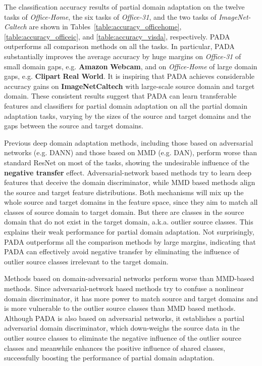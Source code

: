 \documentclass[runningheads]{llncs}
\begin{document}
The classification accuracy results of partial domain adaptation on the twelve tasks of \textit{Office-Home}, the six tasks of \textit{Office-31}, and the two tasks of \textit{ImageNet-Caltech} are shown in Tables~\ref{table:accuracy_officehome}, \ref{table:accuracy_officeic}, and \ref{table:accuracy_visda}, respectively. PADA outperforms all comparison methods on all the tasks. In particular, PADA substantially improves the average accuracy by huge margins on \textit{Office-31} of small domain gaps, e.g. \textbf{Amazon}  \textbf{Webcam}, and on \textit{Office-Home} of large domain gaps, e.g. \textbf{Clipart}  \textbf{Real World}. It is inspiring that PADA achieves considerable accuracy gains on \textbf{ImageNet}\textbf{Caltech} with large-scale source domain and target domain. These consistent results suggest that PADA can learn transferable features and classifiers for partial domain adaptation on all the partial domain adaptation tasks, varying by the sizes of the source and target domains and the gaps between the source and target domains. 

Previous deep domain adaptation methods, including those based on adversarial networks (e.g. DANN) and those based on MMD (e.g. DAN), perform worse than standard ResNet on most of the tasks, showing the undesirable influence of the \textbf{negative transfer} effect. 
Adversarial-network based methods try to learn deep features that deceive the domain discriminator, while MMD based methods align the source and target feature distributions. Both mechanisms will mix up the whole source and target domains in the feature space, since they aim to match all classes of source domain to target domain. But there are classes in the source domain that do not exist in the target domain, a.k.a. outlier source classes. This explains their weak performance for partial domain adaptation.
Not surprisingly, PADA outperforms all the comparison methods by large margins, indicating that PADA can effectively avoid negative transfer by eliminating the influence of outlier source classes irrelevant to the target domain. 

Methods based on domain-adversarial networks perform worse than MMD-based methods. Since adversarial-network based methods try to confuse a nonlinear domain discriminator, it has more power to match source and target domains and is more vulnerable to the outlier source classes than MMD based methods. 
Although PADA is also based on adversarial networks, it establishes a partial adversarial domain discriminator,  which down-weighs the source data in the outlier source classes to eliminate the negative influence of the outlier source classes and meanwhile enhances the positive influence of shared classes, successfully boosting the performance of partial domain adaptation. 
\end{document}
